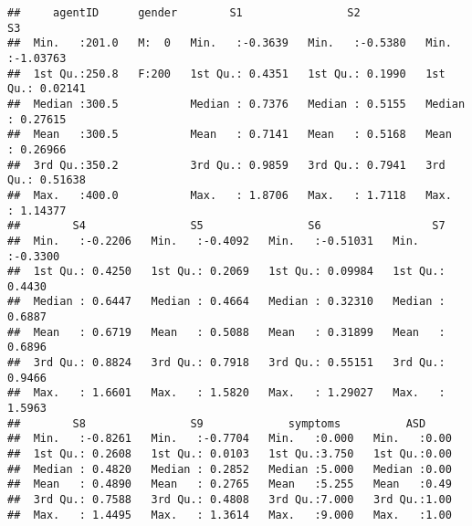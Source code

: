 \documentclass[]{article}
\newenvironment{Shaded}{\begin{snugshade}}{\end{snugshade}}
\newcommand{\KeywordTok}[1]{\textcolor[rgb]{0.13,0.29,0.53}{\textbf{#1}}}
\newcommand{\DecValTok}[1]{\textcolor[rgb]{0.00,0.00,0.81}{#1}}
\newcommand{\StringTok}[1]{\textcolor[rgb]{0.31,0.60,0.02}{#1}}
\newcommand{\CommentTok}[1]{\textcolor[rgb]{0.56,0.35,0.01}{\textit{#1}}}
\newcommand{\OperatorTok}[1]{\textcolor[rgb]{0.81,0.36,0.00}{\textbf{#1}}}
\newcommand{\NormalTok}[1]{#1}
\begin{document}
\begin{verbatim}
##     agentID      gender        S1                S2                S3          
##  Min.   :201.0   M:  0   Min.   :-0.3639   Min.   :-0.5380   Min.   :-1.03763  
##  1st Qu.:250.8   F:200   1st Qu.: 0.4351   1st Qu.: 0.1990   1st Qu.: 0.02141  
##  Median :300.5           Median : 0.7376   Median : 0.5155   Median : 0.27615  
##  Mean   :300.5           Mean   : 0.7141   Mean   : 0.5168   Mean   : 0.26966  
##  3rd Qu.:350.2           3rd Qu.: 0.9859   3rd Qu.: 0.7941   3rd Qu.: 0.51638  
##  Max.   :400.0           Max.   : 1.8706   Max.   : 1.7118   Max.   : 1.14377  
##        S4                S5                S6                 S7         
##  Min.   :-0.2206   Min.   :-0.4092   Min.   :-0.51031   Min.   :-0.3300  
##  1st Qu.: 0.4250   1st Qu.: 0.2069   1st Qu.: 0.09984   1st Qu.: 0.4430  
##  Median : 0.6447   Median : 0.4664   Median : 0.32310   Median : 0.6887  
##  Mean   : 0.6719   Mean   : 0.5088   Mean   : 0.31899   Mean   : 0.6896  
##  3rd Qu.: 0.8824   3rd Qu.: 0.7918   3rd Qu.: 0.55151   3rd Qu.: 0.9466  
##  Max.   : 1.6601   Max.   : 1.5820   Max.   : 1.29027   Max.   : 1.5963  
##        S8                S9             symptoms          ASD      
##  Min.   :-0.8261   Min.   :-0.7704   Min.   :0.000   Min.   :0.00  
##  1st Qu.: 0.2608   1st Qu.: 0.0103   1st Qu.:3.750   1st Qu.:0.00  
##  Median : 0.4820   Median : 0.2852   Median :5.000   Median :0.00  
##  Mean   : 0.4890   Mean   : 0.2765   Mean   :5.255   Mean   :0.49  
##  3rd Qu.: 0.7588   3rd Qu.: 0.4808   3rd Qu.:7.000   3rd Qu.:1.00  
##  Max.   : 1.4495   Max.   : 1.3614   Max.   :9.000   Max.   :1.00
\end{verbatim}

\begin{Shaded}
\end{Shaded}
\end{document}
